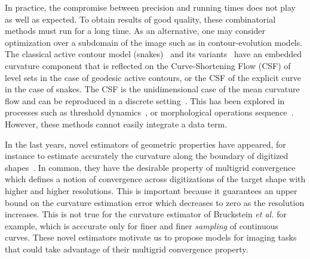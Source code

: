 \documentclass[review]{siamart220329}
\begin{document}
In practice, the compromise between precision and running times does not play as
well as expected. To obtain results of good quality, these combinatorial methods
must run for a long time. As an alternative, one may consider optimization over
a subdomain of the image such as in contour-evolution models. The classical
active contour model (snakes)~\cite{kass1988snakes} and its
variants~\cite{caseles97geodesic,chan01} have an embedded curvature component
that is reflected on the Curve-Shortening Flow (CSF) of level sets in the case
of geodesic active contours, or the CSF of the explicit curve in the case of
snakes. The CSF is the unidimensional case of the mean curvature flow and can be
reproduced in a discrete setting~\cite{merriman1992diffusion}. This has been
explored in processes such as threshold
dynamics~\cite{esedoglu2005threshold,esedoglu2008threshold}, or morphological
operations sequence~\cite{marquezneila14}. However, these methods cannot easily
integrate a data term. 

In the last years, novel estimators of geometric properties have appeared, for
instance to estimate accurately the curvature along the boundary of digitized
shapes~\cite{roussillon11mdca,schindele17mdca,coeurjolly13integral,coeurjolly12multigrid}.
In common, they have the desirable property of multigrid convergence which
defines a notion of convergence across digitizations of the target shape with
higher and higher resolutions. This is important because it guarantees an upper
bound on the curvature estimation error which decreases to zero as the
resolution increases. This is not true for the curvature estimator of Bruckstein
{\em et al.} \cite{bruckstein01convergence} for example, which is acccurate only
for finer and finer {\em sampling} of continuous curves. These novel estimators
motivate us to propose models for imaging tasks that could take advantage of
their multigrid convergence property.
%
%
%
%
\end{document}
